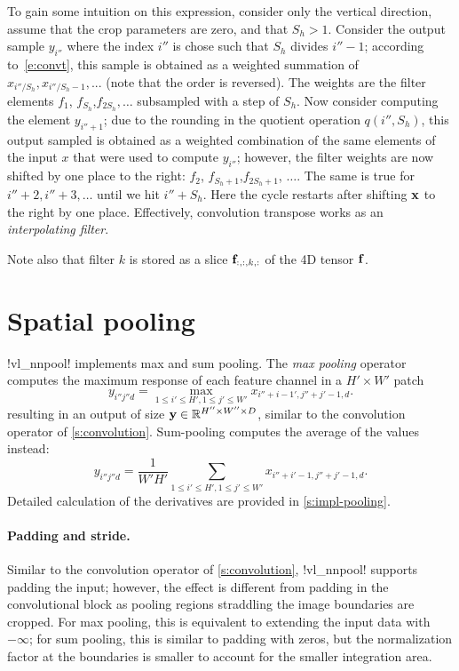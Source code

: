 To gain some intuition on this expression, consider only the vertical direction, assume that the crop parameters are zero, and that $S_h>1$. Consider the output sample $y_{i''}$ where the index $i''$ is chose such that $S_h$ divides $i''-1$; according to~\eqref{e:convt}, this sample is obtained as a weighted summation of $x_{i'' / S_h},x_{i''/S_h-1},...$ (note that the order is reversed). The weights are the filter elements $f_1$, $f_{S_h}$,$f_{2S_h},\dots$ subsampled with a step of $S_h$. Now consider computing the element $y_{i''+1}$; due to the rounding in the quotient operation $q(i'',S_h)$, this output sampled is obtained as a weighted combination of the same elements of the input $x$ that were used to compute $y_{i''}$; however, the filter weights are now shifted by one place to the right: $f_2$, $f_{S_h+1}$,$f_{2S_h+1}$, $\dots$. The same is true for $i''+2, i'' + 3,\dots$ until we hit $i'' + S_h$. Here the cycle restarts after shifting $\mathbf{x}$ to the right by one place. Effectively, convolution transpose works as an \emph{interpolating filter}.

Note also that filter $k$ is stored as a slice $\mathbf{f}_{:,:,k,:}$ of the 4D tensor $\mathbf{f}$.

\section{Spatial pooling}\label{s:pooling}

!vl_nnpool! implements max and sum pooling. The \emph{max pooling} operator computes the maximum response of each feature channel in a $H' \times W'$ patch
\[
y_{i''j''d} = \max_{1\leq i' \leq H', 1 \leq j' \leq W'} x_{i''+i-1',j''+j'-1,d}.
\]
resulting in an output of size $\mathbf{y}\in\mathbb{R}^{H''\times W'' \times D}$, similar to the convolution operator of \autoref{s:convolution}. Sum-pooling computes the average of the values instead:
\[
y_{i''j''d} = \frac{1}{W'H'}
\sum_{1\leq i' \leq H', 1 \leq j' \leq W'} x_{i''+i'-1,j''+j'-1,d}.
\]
Detailed calculation of the derivatives are provided in \autoref{s:impl-pooling}.

\paragraph{Padding and stride.} Similar to the convolution operator of \autoref{s:convolution}, !vl_nnpool! supports padding the input; however, the effect is different from padding in the convolutional block as pooling regions straddling the image boundaries are cropped. For max pooling, this is equivalent to extending the input data with $-\infty$; for sum pooling, this is similar to padding with zeros, but the normalization factor at the boundaries is smaller to account for the smaller integration area.

